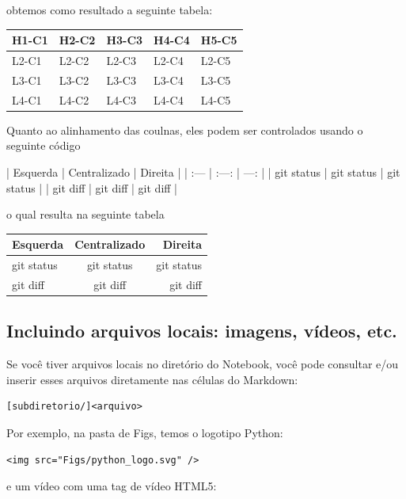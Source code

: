 \documentclass[11pt]{article}
\newenvironment{Shaded}{}{}
\newcommand{\NormalTok}[1]{{#1}}
\begin{document}
obtemos como resultado a seguinte tabela:

\begin{longtable}[c]{@{}lllll@{}}
\toprule
H1-C1 & H2-C2 & H3-C3 & H4-C4 & H5-C5\tabularnewline
\midrule
\endhead
L2-C1 & L2-C2 & L2-C3 & L2-C4 & L2-C5\tabularnewline
L3-C1 & L3-C2 & L3-C3 & L3-C4 & L3-C5\tabularnewline
L4-C1 & L4-C2 & L4-C3 & L4-C4 & L4-C5\tabularnewline
\bottomrule
\end{longtable}

Quanto ao alinhamento das coulnas, eles podem ser controlados usando o
seguinte código

\begin{Shaded}
\begin{Highlighting}[]
\NormalTok{| Esquerda     | Centralizado   | Direita       |}
\NormalTok{| :---         |     :---:      |          ---: |}
\NormalTok{| git status   | git status     | git status    |}
\NormalTok{| git diff     | git diff       | git diff      |}
\end{Highlighting}
\end{Shaded}

o qual resulta na seguinte tabela

\begin{longtable}[c]{@{}lcr@{}}
\toprule
Esquerda & Centralizado & Direita\tabularnewline
\midrule
\endhead
git status & git status & git status\tabularnewline
git diff & git diff & git diff\tabularnewline
\bottomrule
\end{longtable}

    \subsection{Incluindo arquivos locais: imagens, vídeos,
etc.}\label{incluindo-arquivos-locais-imagens-vuxeddeos-etc.}

Se você tiver arquivos locais no diretório do Notebook, você pode
consultar e/ou inserir esses arquivos diretamente nas células do
Markdown:

\begin{verbatim}
[subdiretorio/]<arquivo>
\end{verbatim}

Por exemplo, na pasta de Figs, temos o logotipo Python:

\begin{verbatim}
<img src="Figs/python_logo.svg" />
\end{verbatim}

e um vídeo com uma tag de vídeo HTML5:
\end{document}
